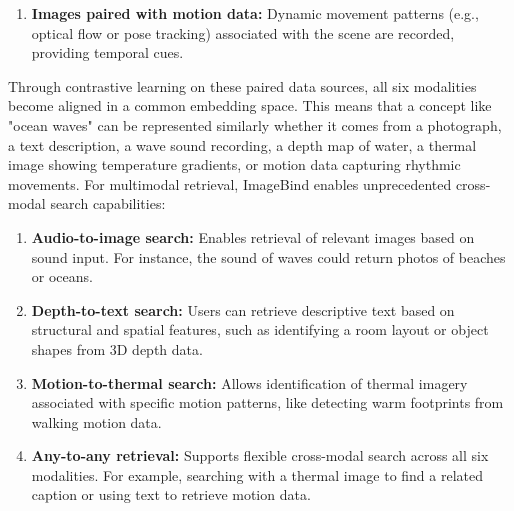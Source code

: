 \documentclass[conference]{IEEEtran}
\begin{document}
\begin{enumerate}
\begin{enumerate}
    \item \textbf{Images paired with motion data:} Dynamic movement patterns (e.g., optical flow or pose tracking) associated with the scene are recorded, providing temporal cues.
\end{enumerate}

Through contrastive learning on these paired data sources, all six modalities become aligned in a common embedding space. This means that a concept like "ocean waves" can be represented similarly whether it comes from a photograph, a text description, a wave sound recording, a depth map of water, a thermal image showing temperature gradients, or motion data capturing rhythmic movements.
For multimodal retrieval, ImageBind enables unprecedented cross-modal search capabilities:

\begin{enumerate}
    \item \textbf{Audio-to-image search:} Enables retrieval of relevant images based on sound input. For instance, the sound of waves could return photos of beaches or oceans.
    
    \item \textbf{Depth-to-text search:} Users can retrieve descriptive text based on structural and spatial features, such as identifying a room layout or object shapes from 3D depth data.
    
    \item \textbf{Motion-to-thermal search:} Allows identification of thermal imagery associated with specific motion patterns, like detecting warm footprints from walking motion data.
    
    \item \textbf{Any-to-any retrieval:} Supports flexible cross-modal search across all six modalities. For example, searching with a thermal image to find a related caption or using text to retrieve motion data.
\end{enumerate}


\end{enumerate}
\end{document}
